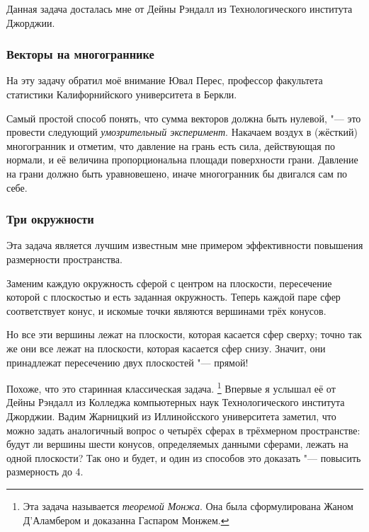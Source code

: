 \documentclass[twoside]{book}
\begin{document}
Данная задача досталась мне от Дейны Рэндалл из Технологического института Джорджии.

\subsubsection*{Векторы на многограннике}%

На эту задачу обратил моё внимание Ювал Перес, профессор факультета статистики Калифорнийского университета в Беркли. %

\medskip
 
Самый простой способ понять, что сумма векторов должна быть нулевой, "--- это провести следующий \emph{умозрительный эксперимент}.
Накачаем воздух в (жёсткий) многогранник и отметим, что давление на грань есть сила, действующая по нормали, и её величина пропорциональна площади поверхности грани.
Давление на грани должно быть уравновешено, иначе многогранник бы двигался сам по себе.
\heart

\subsubsection*{Три окружности}%

Эта задача является лучшим известным мне примером эффективности повышения размерности пространства.

\medskip

Заменим каждую окружность сферой с центром на плоскости, пересечение которой с плоскостью и есть заданная окружность.
Теперь каждой паре сфер соответствует конус, и искомые точки являются вершинами трёх конусов. %

Но все эти вершины лежат на плоскости, которая касается сфер сверху;
точно так же они все лежат на плоскости, которая касается сфер снизу.
Значит, они принадлежат пересечению двух плоскостей "--- прямой! \heart

Похоже, что это старинная классическая задача.%
\footnote{Эта задача называется \emph{теоремой Монжа}. Она была сформулирована Жаном Д’Аламбером и доказанна Гаспаром Монжем.}
Впервые я услышал её от Дейны Рэндалл %
из Колледжа компьютерных наук Технологического института Джорджии.
Вадим Жарницкий из Иллинойсского университета заметил, что можно задать аналогичный вопрос о четырёх сферах в трёхмерном пространстве: будут ли вершины шести конусов, определяемых данными сферами, лежать на одной плоскости?
Так оно и будет, и один из способов это доказать "--- повысить размерность до 4.
\end{document}
